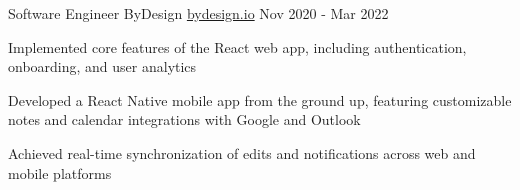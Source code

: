 \begin{cventries}
\cventry
{Software Engineer} %
{ByDesign} %
{\href{https://bydesign.io}{bydesign.io}} %
{Nov 2020 - Mar 2022} %
{
  \begin{cvitems} %
    \item {Implemented core features of the React web app, including authentication, onboarding, and user analytics}
    \item {Developed a React Native mobile app from the ground up, featuring customizable notes and calendar integrations with Google and Outlook}
    \item {Achieved real-time synchronization of edits and notifications across web and mobile platforms}
  \end{cvitems}
}



\end{cventries}